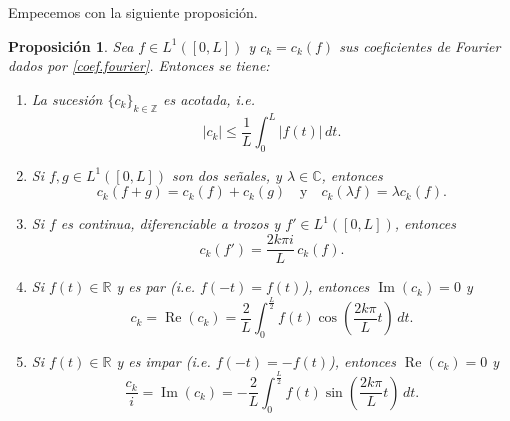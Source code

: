 \documentclass[12pt, a4paper]{amsbook}
\renewcommand{\Re}{\operatorname{Re}}
\def\Im{\operatorname {\mathrm{Im}}}
\newcommand{\R}{{\mathbb R}}
\newcommand{\Z}{{\mathbb Z}}
\newcommand{\C}{{\mathbb C}}
\newtheorem{prop}[teo]{Proposición}
\theoremstyle{remark}
\theoremstyle{definition}
\numberwithin{section}{chapter}
\numberwithin{subsection}{section}
\numberwithin{equation}{section}
\numberwithin{figure}{chapter}
\begin{document}
Empecemos con la siguiente proposición.
\begin{prop}\label{prop.coef}
Sea $f\in L^1([0,L])$ y $c_k=c_k(f)$ sus coeficientes de Fourier dados por \eqref{coef.fourier}. Entonces se tiene:
\begin{enumerate}
\item La sucesión $\{c_k\}_{k\in\Z}$ es acotada, i.e.
$$
|c_k|\le \frac{1}{L}\int_0^L |f(t)|\, dt.
$$

\item Si $f, g\in L^1([0,L])$ son dos señales, y $\lambda\in\C$, entonces
$$
c_k(f+g) = c_k(f)+c_k(g) \quad \text{y}\quad c_k(\lambda f) = \lambda c_k(f).
$$

\item Si $f$ es continua, diferenciable a trozos y $f'\in L^1([0,L])$, entonces
$$
c_k(f') = \frac{2k\pi i}{L}\, c_k(f).
$$

\item Si $f(t)\in\R$ y es par (i.e. $f(-t)=f(t)$), entonces $\Im(c_k)=0$ y
$$
c_k = \Re(c_k) = \frac{2}{L}\int_0^{\frac{L}{2}} f(t)\cos\left(\frac{2k\pi}{L}t\right)\, dt.
$$

\item Si $f(t)\in\R$ y es impar (i.e. $f(-t) = -f(t)$), entonces $\Re(c_k)=0$ y
$$
\frac{c_k}{i} = \Im(c_k) = -\frac{2}{L}\int_0^{\frac{L}{2}} f(t)\sin\left(\frac{2k\pi}{L}t\right)\, dt.
$$
\end{enumerate}
\end{prop}
\end{document}
